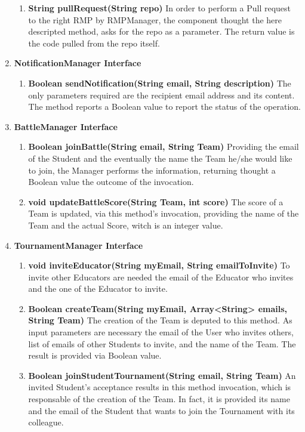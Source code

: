 \begin{enumerate}
\begin{enumerate}[label=$\bullet$]
            \item \textbf{String pullRequest(String repo)} In order to perform a Pull request to the right RMP by RMPManager, the component thought the here descripted method, asks for the repo as a parameter. The return value is the code pulled from the repo itself.
        \end{enumerate} 
    \item \textbf{NotificationManager Interface}
        \begin{enumerate}[label=$\bullet$]
            \item \textbf{Boolean sendNotification(String email, String description)} The only parameters required are the recipient email address and its content. The method reports a Boolean value to report the status of the operation.
        \end{enumerate}
    \item \textbf{BattleManager Interface}
        \begin{enumerate}[label=$\bullet$]
            \item \textbf{Boolean joinBattle(String email, String Team)} Providing the email of the Student and the eventually the name the Team he/she would like to join, the Manager performs the information, returning thought a Boolean value the outcome of the invocation.
            \item \textbf{void updateBattleScore(String Team, int score)} The score of a Team is updated, via this method's invocation, providing the name of the Team and the actual Score, witch is an integer value.
        \end{enumerate}
    \item \textbf{TournamentManager Interface}
        \begin{enumerate}[label=$\bullet$]
        \item \textbf{void inviteEducator(String myEmail, String emailToInvite)} To invite other Educators are needed the email of the Educator who invites and the one of the Educator to invite.
        \item \textbf{Boolean createTeam(String myEmail, Array<String> emails, String Team)} The creation of the Team is deputed to this method. As input parameters are necessary the email of the User who invites others, list of emails of other Students to invite, and the name of the Team. The result is provided via Boolean value. 
        \item \textbf{Boolean joinStudentTournament(String email, String Team)} An invited Student's acceptance results in this method invocation, which is responsable of the creation of the Team. In fact, it is provided its name and the email of the Student that wants to join the Tournament with its colleague.

\end{enumerate}
\end{enumerate}
